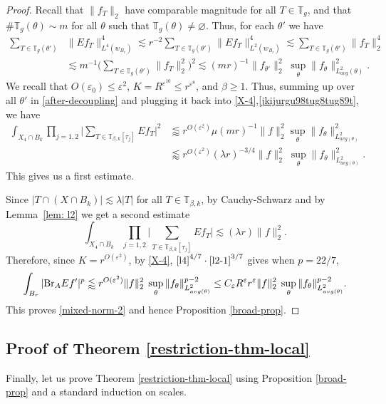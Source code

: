 \documentclass{amsart}%
\numberwithin{equation}{section}
\newcommand{\be}{\beta}
\newcommand{\e}{\varepsilon}
\newcommand{\la}{\lambda}
\newcommand{\ZT}{\mathbb{T}}
\newcommand{\Br}{{\rm{Br}}}
\newcommand{\1}{\mathbbm{1}}
\begin{document}
\begin{proof}
	Recall that $\|f_T\|_{2}$ have comparable magnitude for all $T\in\ZT_g$, and that $\#\ZT_g(\theta)\sim m$ for all $\theta$ such that $\ZT_g(\theta)\not=\varnothing$.
	Thus, for each $\theta'$ we have
	\begin{align}
		\nonumber
		\sum_{T\in\ZT_g(\theta')}&\big\|Ef_T\big\|_{L^4(w_{B_r})}^4\lesssim r^{-2}\sum_{T\in\ZT_g(\theta')}\big\|Ef_T\big\|_{L^2(w_{B_r})}^4\lesssim\sum_{T\in\ZT_g(\theta')}\|f_T\|_2^4\\
		\label{after-decoupling}
		&\lesssim m^{-1} \Big(\sum_{T\in\ZT_g(\theta')}\big\|f_T\big\|_{2}^2\Big)^2\lesssim  (mr)^{-1}\|f_{\theta'}\|_2^2\;\sup_\theta\|f_\theta\|_{L^2_{avg}(\theta)}^2.
	\end{align} 
	We recall that $O(\e_0)\leq\e^2$, $K=R^{\e^{10}}\leq r^{\e^8}$, and $\be\ge 1$.
	Thus, summing up over all $\theta'$ in \eqref{after-decoupling} and plugging it back into \eqref{X-4},\eqref{jkijurgu98tug8tug89t}, we have
	\begin{align}
		\label{l4}
		\int_{X_4\cap B_k}\prod_{j=1,2}\Big|\sum_{T\in\ZT_{\be, k}[\tau_j]}Ef_{T}\Big|^2&\lessapprox r^{O(\e^2)}\mu (m r)^{-1}\|f\|_2^2\sup_\theta\|f_\theta\|_{L^2_{avg(\theta)}}^2\\  \nonumber
		&\lessapprox r^{O(\e^{2})}(\la r)^{-3/4}\|f\|_2^2\;\sup_\theta\|f_\theta\|_{L^2_{avg(\theta)}}^2.
	\end{align}
    This gives us a first estimate.
	
	
	Since $|T\cap ( X\cap B_k)|\lesssim \la  |T|$ for all $T\in\ZT_{\beta,k}$, by Cauchy-Schwarz and by Lemma~\ref{lem: l2} we get a second estimate  
	\begin{equation}
		\label{l2-1}
		\int_{X_4\cap B_k}\prod_{j=1,2}\Big|\sum_{T\in\ZT_{\be, k}[\tau_j]}Ef_{T}\Big|\lesssim (\la  r)\|f\|_2^2.
	\end{equation}
	Therefore, since $K=r^{O(\e^2)}$, by \eqref{X-4}, $\eqref{l4}^{4/7}\cdot\eqref{l2-1}^{3/7}$ gives when $p=22/7$,
	\begin{align}
		\nonumber
		\int_{B_r}|\Br_{A} Ef'|^p\lessapprox r^{O(\e^2)} \|f\|_2^2\;\sup_\theta\|f_\theta\|_{L^2_{avg(\theta)}}^{p-2}\leq C_\e R^{\e}r^\e\|f\|_2^2\;\sup_\theta\|f_\theta\|_{L^2_{avg(\theta)}}^{p-2}.
	\end{align}
	This proves \eqref{mixed-norm-2} and hence Proposition \ref{broad-prop}. \qedhere
	
	
\end{proof}

\medskip 

\subsection{Proof of Theorem \ref{restriction-thm-local}}
Finally, let us prove Theorem \ref{restriction-thm-local} using Proposition \ref{broad-prop} and a standard induction on scales.
\end{document}
